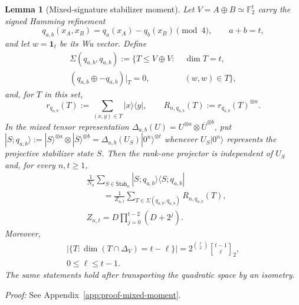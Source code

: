 \documentclass[journal,twocolumn]{IEEEtran}
\newtheorem{lemma}[theorem]{Lemma}
\theoremstyle{definition}
\theoremstyle{plain}
\newcommand{\F}{\mathbb F}
\newcommand{\Stab}{\mathsf{Stab}}
\newcommand{\one}{\bm 1}
\newcommand{\gbinom}[3]{\genfrac{[}{]}{0pt}{}{#1}{#2}_{#3}}
\begin{document}
\begin{lemma}[Mixed-signature stabilizer moment]
\label{lemS:mixed-moment}
Let $V=A\oplus B\simeq\F_2^t$ carry the signed Hamming refinement
\begin{equation}
 q_{a,b}(x_A,x_B)=q_a(x_A)-q_b(x_B)\pmod4,
 \qquad a+b=t,
 \end{equation}
and let $w=\one_t$ be its Wu vector.  Define
\begin{equation}
 \begin{aligned}
 \Sigma(q_{a,b},q_{a,b}):=\{T\leq V\oplus V:\;&\dim T=t,\\
 (q_{a,b}\oplus-q_{a,b})|_T=0,\;&(w,w)\in T\},
 \end{aligned}
\end{equation}
and, for $T$ in this set,
\begin{equation}
 r_{q_{a,b}}(T):=\sum_{(x,y)\in T}|x\rangle\!\langle y|,
 \qquad R_{n,q_{a,b}}(T):=r_{q_{a,b}}(T)^{\otimes n}.
\end{equation}
In the mixed tensor representation
$\Delta_{a,b}(U)=U^{\otimes a}\otimes\overline U^{\otimes b}$, put
$|S;q_{a,b}\rangle:=|S\rangle^{\otimes a}\otimes
|\overline S\rangle^{\otimes b}
=\Delta_{a,b}(U_S)|0^n\rangle^{\otimes t}$ whenever
$U_S|0^n\rangle$ represents the projective stabilizer state $S$.  Then the
rank-one projector is independent of $U_S$ and, for every $n,t\geq1$,
\begin{equation}
 \begin{aligned}
 &\frac1{N_n}\sum_{S\in\Stab_n}|S;q_{a,b}\rangle\!\langle S;q_{a,b}|\\
 &\qquad=\frac1{Z_{n,t}}
   \sum_{T\in\Sigma(q_{a,b},q_{a,b})}R_{n,q_{a,b}}(T),\\
 &Z_{n,t}=D\prod_{j=0}^{t-2}(D+2^j).
 \end{aligned}
 \label{eqS:mixed-moment-lemma}
\end{equation}
Moreover,
\begin{equation}
 \begin{gathered}
 \bigl|\{T:\dim(T\cap\Delta_V)=t-\ell\}\bigr|
 =2^{\binom\ell2}\gbinom{t-1}{\ell}{2},\\
 0\leq\ell\leq t-1.
 \end{gathered}
 \label{eqS:mixed-diagonal-count}
\end{equation}
The same statements hold after transporting the quadratic space by an
isometry.
\end{lemma}

\noindent\emph{Proof:} See Appendix~\ref{app:proof-mixed-moment}.\par
\end{document}
